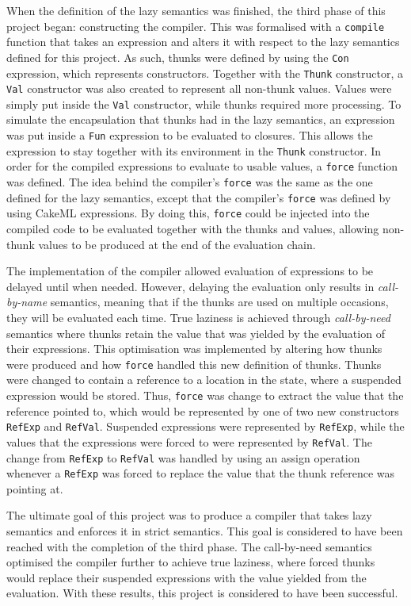 When the definition of the lazy semantics was finished, the third phase of this
project began: constructing the compiler. This was formalised with a
\texttt{compile} function that takes an expression and alters it with respect to
the lazy semantics defined for this project. As such, thunks were defined by
using the \texttt{Con} expression, which represents constructors. Together with
the \texttt{Thunk} constructor, a \texttt{Val} constructor was also created to
represent all non-thunk values. Values were simply put inside the \texttt{Val}
constructor, while thunks required more processing. To simulate the
encapsulation that thunks had in the lazy semantics, an expression was put
inside a \texttt{Fun} expression to be evaluated to closures. This allows the
expression to stay together with its environment in the \texttt{Thunk}
constructor. In order for the compiled expressions to evaluate to usable values,
a \texttt{force} function was defined. The idea behind the compiler's
\texttt{force} was the same as the one defined for the lazy semantics, except
that the compiler's \texttt{force} was defined by using CakeML expressions.
By doing this, \texttt{force} could be injected into the compiled code to be
evaluated together with the thunks and values, allowing non-thunk values to be
produced at the end of the evaluation chain.

The implementation of the compiler allowed evaluation of expressions to be
delayed until when needed. However, delaying the evaluation only results in
\textit{call-by-name} semantics, meaning that if the thunks are used on multiple
occasions, they will be evaluated each time. True laziness is achieved through
\textit{call-by-need} semantics where thunks retain the value that was yielded
by the evaluation of their expressions. This optimisation was implemented by
altering how thunks were produced and how \texttt{force} handled this new
definition of thunks. Thunks were changed to contain a reference to a location
in the state, where a suspended expression would be stored. Thus, \texttt{force}
was change to extract the value that the reference pointed to, which would be
represented by one of two new constructors \texttt{RefExp} and \texttt{RefVal}.
Suspended expressions were represented by \texttt{RefExp}, while the values that
the expressions were forced to were represented by \texttt{RefVal}. The change
from \texttt{RefExp} to \texttt{RefVal} was handled by using an assign operation
whenever a \texttt{RefExp} was forced to replace the value that the thunk
reference was pointing at.

The ultimate goal of this project was to produce a compiler that takes lazy
semantics and enforces it in strict semantics. This goal is considered to have
been reached with the completion of the third phase. The call-by-need semantics
optimised the compiler further to achieve true laziness, where forced thunks
would replace their suspended expressions with the value yielded from
the evaluation. With these results, this project is considered to have been
successful.
